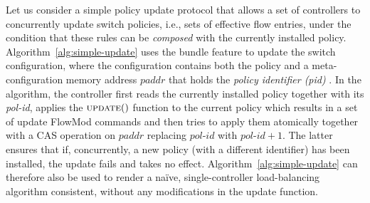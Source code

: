 \documentclass[conference]{sigcomm-alternate}
\newcommand{\paddr}{\textit{paddr}\xspace}
\newcommand{\pid}{\textit{pol-id}\xspace}
\newcommand{\ufunc}{update} %
\newcommand{\liron}[1]{\textit{\textcolor{mygreen}{[liron]: #1}}} %
\newcommand{\petr}[1]{\textit{\textcolor{blue}{[petr]: #1}}} %
\begin{document}
Let us consider a simple policy update protocol that
allows a set of  controllers to concurrently update switch policies, i.e., sets of
effective flow entries, under the
condition that these rules can be \emph{composed} with the currently installed
policy.
Algorithm~\ref{alg:simple-update} uses the bundle feature to update
the switch configuration, where the configuration contains both the
policy and a meta-configuration memory address $\paddr$ that holds the \emph{policy identifier (pid)} .
In the algorithm, the controller first reads the currently installed
policy together with its {\pid},  applies the
$\textsc{\ufunc}()$ function to the current policy which results in a
set of update FlowMod commands and then tries to apply them
atomically together with a CAS operation on $\paddr$ replacing $\pid$
with $\pid+1$.
The latter ensures that if, concurrently, a new policy (with a different identifier) has been installed, the update
fails and takes no effect.
Algorithm~\ref{alg:simple-update} can therefore also be used
to render a na\"ive, single-controller load-balancing algorithm
consistent, without any modifications in the update function.





\end{document}
